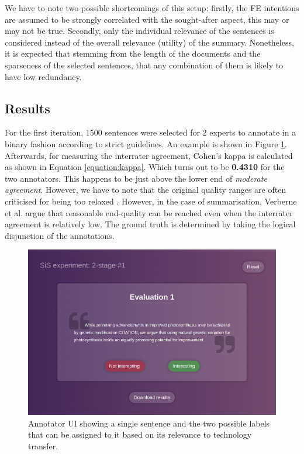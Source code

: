We have to note two possible shortcomings of this setup: firstly, the FE intentions are assumed to be strongly correlated with the sought-after aspect, this may or may not be true. Secondly, only the individual relevance of the sentences is considered instead of the overall relevance (utility) of the summary. Nonetheless, it is expected that stemming from the length of the documents and the sparseness of the selected sentences, that any combination of them is likely to have low redundancy.

\subsection{Results}

For the first iteration, 1500 sentences were selected for 2 experts to annotate in a binary fashion according to strict guidelines. An example is shown in Figure \ref{fig:annotator}. Afterwards, for measuring the interrater agreement, Cohen's kappa \cite{cohen1960coefficient} is calculated as shown in Equation \ref{equation:kappa}. Which turns out to be \textbf{0.4310} for the two annotators. This happens to be just above the lower end of \textit{moderate agreement}. However, we have to note that the original quality ranges are often criticised for being too relaxed \cite{mchugh2012interrater}. However, in the case of summarisation, Verberne et al. \cite{verberne2018creating} argue that reasonable end-quality can be reached even when the interrater agreement is relatively low. The ground truth is determined by taking the logical disjunction of the annotations.

\begin{figure}
    \centering
    \includegraphics[width=0.75\linewidth]{figures/annotator.png}
    \captionsetup{width=.9\linewidth}
    \caption{Annotator UI showing a single sentence and the two possible labels that can be assigned to it based on its relevance to technology transfer.}
    \label{fig:annotator}
\end{figure}

